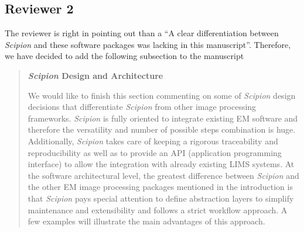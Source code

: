 \documentclass[a4paper,12pt]{article}
\def\scipion{\textit{Scipion}\xspace}
\begin{document}
\begin{reviewer}
\section*{Reviewer 2}



\reply %
The reviewer is right in pointing out than a ``A clear differentiation between \scipion and these software packages was lacking in this manuscript''. Therefore, we have decided to add the following subsection to the manuscript

\begin{quote}

\textbf{\scipion Design and Architecture}

We would like to finish this section commenting on some of \scipion  design decisions that differentiate \scipion from other image processing frameworks. \scipion
is fully oriented to integrate existing
EM software and therefore the versatility and number of possible steps
combination is huge. Additionally, \scipion takes care of keeping a 
rigorous traceability and reproducibility as well as to provide an API (application programming interface) to allow the integration  with already existing LIMS systems. At the software architectural level,  the greatest difference 
between \scipion and the other EM image processing packages mentioned in the introduction 
is that  \scipion pays special attention to define abstraction layers to simplify maintenance
and extensibility and follows a strict workflow approach. A few examples will illustrate the main advantages of this approach.


\end{quote}
\end{reviewer}
\end{document}
